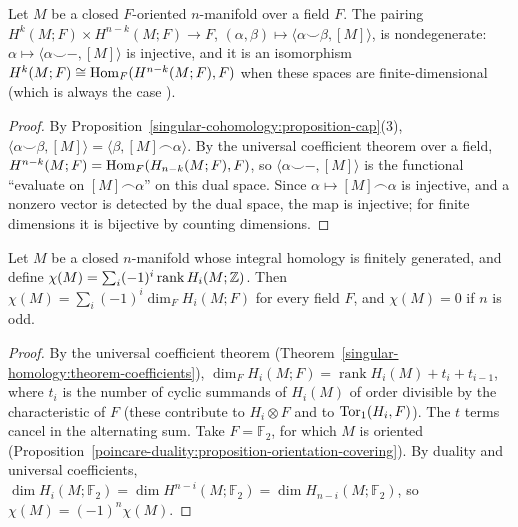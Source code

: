 \begin{corollary}\label{poincare-duality:corollary-cup-pairing}
Let $M$ be a closed $F$-oriented $n$-manifold over a field $F$. The pairing $H^k(M; F) \times H^{n-k}(M; F) \to F$, $(\alpha, \beta) \mapsto \langle \alpha \smile \beta, [M] \rangle$,
is nondegenerate: $\alpha \mapsto \langle \alpha \smile -, [M] \rangle$ is injective, and it is an isomorphism $H^k(M; F) \cong \operatorname{Hom}_F(H^{n-k}(M; F), F)$ when these spaces are
finite-dimensional (which is always the case \cite[Appendix]{hatcher-at}).
\end{corollary}

\begin{proof}
By Proposition~\ref{singular-cohomology:proposition-cap}(3), $\langle \alpha \smile \beta, [M] \rangle = \langle \beta, [M] \frown \alpha \rangle$. By the universal coefficient
theorem over a field, $H^{n-k}(M; F) = \operatorname{Hom}_F(H_{n-k}(M; F), F)$, so $\langle \alpha \smile -, [M] \rangle$ is the functional ``evaluate on $[M] \frown \alpha$'' on this dual space. Since
$\alpha \mapsto [M] \frown \alpha$ is injective, and a nonzero vector is detected by the dual space, the map is injective; for finite dimensions it is bijective by counting
dimensions.
\end{proof}

\begin{corollary}\label{poincare-duality:corollary-euler-odd}
Let $M$ be a closed $n$-manifold whose integral homology is finitely generated, and define $\chi(M) = \sum_i (-1)^i \operatorname{rank} H_i(M; \mathbb{Z})$. Then
$\chi(M) = \sum_i(-1)^i\dim_F H_i(M; F)$ for every field $F$, and $\chi(M) = 0$ if $n$ is odd.
\end{corollary}

\begin{proof}
By the universal coefficient theorem (Theorem~\ref{singular-homology:theorem-coefficients}), $\dim_F H_i(M; F) = \operatorname{rank} H_i(M) + t_i + t_{i-1}$, where $t_i$ is the number of
cyclic summands of $H_i(M)$ of order divisible by the characteristic of $F$ (these contribute to $H_i \otimes F$ and to $\operatorname{Tor}_1(H_i, F)$). The $t$ terms cancel in the alternating
sum. Take $F = \mathbb{F}_2$, for which $M$ is oriented (Proposition~\ref{poincare-duality:proposition-orientation-covering}). By duality and universal coefficients,
$\dim H_i(M; \mathbb{F}_2) = \dim H^{n-i}(M; \mathbb{F}_2) = \dim H_{n-i}(M; \mathbb{F}_2)$, so $\chi(M) = (-1)^n\chi(M)$.
\end{proof}

